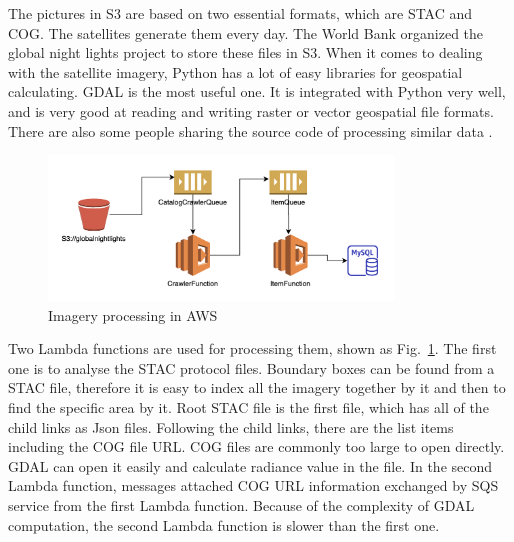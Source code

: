 \documentclass[conference]{IEEEtran}
\begin{document}
The pictures in S3 are based on two essential formats, which are STAC and COG. The satellites generate them every day. 
The World Bank organized the global night lights project to store these files in S3. When it comes to dealing with the satellite 
imagery, Python has a lot of easy libraries for geospatial calculating. GDAL is the most useful one. 
It is integrated with Python very well, and is very good at reading and writing raster or vector geospatial file formats.
There are also some people sharing the source code of processing similar data \cite{Howtopro5:online}.


\begin{figure}[htbp]
    \centerline{\includegraphics[width=260pt]{images/dataprocess.png}}
    \caption{Imagery processing in AWS}
    \label{fig4}
\end{figure}

Two Lambda functions are used for processing them, shown as Fig.~\ref{fig4}. The first one is to analyse the STAC protocol files. Boundary boxes can be found from a STAC file, therefore it is easy to index
all the imagery together by it and then to find the specific area by it. Root STAC file is the first file, which has all of the child links as Json files. 
Following the child links, there are the list items including the COG file URL. COG files are commonly too large to open directly. GDAL can open it easily and calculate radiance 
value in the file. In the second Lambda function, messages attached COG URL information exchanged by SQS service from the first Lambda function. Because of the complexity 
of GDAL computation, the second Lambda function is slower than the first one.
\end{document}
